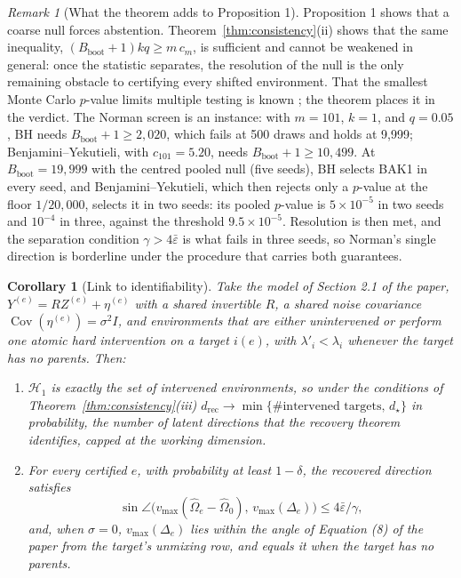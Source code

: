 \documentclass[11pt]{article}
\newtheorem{corollary}{Corollary}
\theoremstyle{remark}
\newtheorem{remark}{Remark}
\newcommand{\op}{\operatorname}
\newcommand{\Hone}{\mathcal{H}_1}
\newcommand{\Bb}{B_{\mathrm{boot}}}
\begin{document}
\begin{remark}[What the theorem adds to Proposition 1]
Proposition 1 shows that a coarse null forces abstention. Theorem~\ref{thm:consistency}(ii) shows that the same inequality, $(\Bb+1)kq\ge m\,c_m$, is sufficient and cannot be weakened in general: once the statistic separates, the resolution of the null is the only remaining obstacle to certifying every shifted environment. That the smallest Monte Carlo $p$-value limits multiple testing is known \citep{gandy2016framework}; the theorem places it in the verdict. The Norman screen is an instance: with $m=101$, $k=1$, and $q=0.05$, BH needs $\Bb+1\ge2{,}020$, which fails at 500 draws and holds at 9{,}999; Benjamini--Yekutieli, with $c_{101}=5.20$, needs $\Bb+1\ge10{,}499$. At $\Bb=19{,}999$ with the centred pooled null (five seeds), BH selects BAK1 in every seed, and Benjamini--Yekutieli, which then rejects only a $p$-value at the floor $1/20{,}000$, selects it in two seeds: its pooled $p$-value is $5\times10^{-5}$ in two seeds and $10^{-4}$ in three, against the threshold $9.5\times10^{-5}$. Resolution is then met, and the separation condition $\gamma>4\bar\varepsilon$ is what fails in three seeds, so Norman's single direction is borderline under the procedure that carries both guarantees.
\end{remark}

\begin{corollary}[Link to identifiability]
\label{cor:ident}
Take the model of Section 2.1 of the paper, $Y^{(e)}=RZ^{(e)}+\eta^{(e)}$ with a shared invertible $R$, a shared noise covariance $\op{Cov}(\eta^{(e)})=\sigma^2I$, and environments that are either unintervened or perform one atomic hard intervention on a target $i(e)$, with $\lambda'_{i}<\lambda_i$ whenever the target has no parents. Then:
\begin{enumerate}
  \item[(a)] $\Hone$ is exactly the set of intervened environments, so under the conditions of Theorem~\ref{thm:consistency}(iii) $d_{\mathrm{rec}}\to\min\{\#\text{intervened targets},\,d_\star\}$ in probability, the number of latent directions that the recovery theorem identifies, capped at the working dimension.
  \item[(b)] For every certified $e$, with probability at least $1-\delta$, the recovered direction satisfies
  \[\sin\angle\bigl(v_{\max}(\widehat\Omega_e-\widehat\Omega_0),\,v_{\max}(\Delta_e)\bigr)\le4\bar\varepsilon/\gamma,\]
  and, when $\sigma=0$, $v_{\max}(\Delta_e)$ lies within the angle of Equation (8) of the paper from the target's unmixing row, and equals it when the target has no parents.
\end{enumerate}
\end{corollary}
\end{document}
